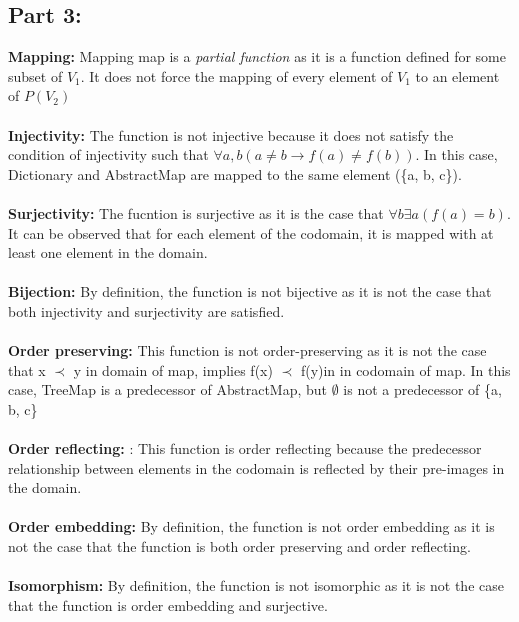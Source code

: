 \subsection{Part 3: }
\textbf{Mapping: }Mapping map is a \textit{partial function} as it is a function defined for some subset of $V_{1}$. It does not force the mapping of every element of $V_{1}$ to an element of $\textit{P}(V_{2})$\\ \\
\textbf{Injectivity: }The function is not injective because it does not satisfy the condition of injectivity such that $\forall a, b (a \neq b \rightarrow f(a) \neq f(b))$. In this case, Dictionary and AbstractMap are mapped to the same element (\{a, b, c\}). \\ \\
\textbf{Surjectivity: }The fucntion is surjective as it is the case that $\forall b \exists a (f(a) = b)$. It can be observed that for each element of the codomain, it is mapped with at least one element in the domain. \\ \\
\textbf{Bijection: }By definition, the function is not bijective as it is not the case that both injectivity and surjectivity are satisfied. \\ \\ 
\textbf{Order preserving: }This function is not order-preserving as it is not the case that x $\prec$ y in domain of map, implies f(x) $\prec$ f(y)in in codomain of map. In this case, TreeMap is a predecessor of AbstractMap, but $\emptyset$ is not a predecessor of \{a, b, c\}\\ \\
\textbf{Order reflecting: }: This function is order reflecting because the predecessor relationship between elements in the codomain is reflected by their pre-images in the domain. \\ \\
\textbf{Order embedding: }By definition, the function is not order embedding as it is not the case that the function is both order preserving and order reflecting.\\ \\
\textbf{Isomorphism: }By definition, the function is not isomorphic as it is not the case that the function is order embedding and surjective.\\